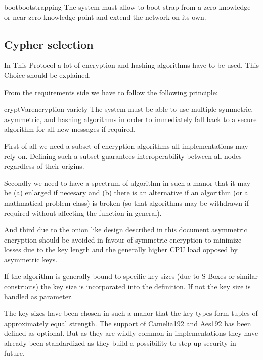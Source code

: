 \begin{requirement}{boot}{bootstrapping}
	The system must allow to boot strap from a zero knowledge or near zero knowledge point and extend the network on its own. 
\end{requirement}

\subsection{Cypher selection}
In This Protocol a lot of encryption and hashing algorithms have to be used. This Choice should be explained. 

From the requirements side we have to follow the following principle:
\begin{requirement}{cryptVar}{encryption variety}
	The system must be able to use multiple symmetric, asymmetric, and hashing algorithms in order to immediately fall back to a secure algorithm for all new messages if required. 
\end{requirement}

First of all we need a subset of encryption algorithms all implementations may rely on. Defining such a subset guarantees interoperability between all nodes regardless of their origins. 

Secondly we need to have a spectrum of algorithm in such a manor that it may be (a) enlarged if necesary and (b) there is an alternative if an algorithm (or a mathmatical problem class) is broken (so that algorithms may be withdrawn if required without affecting the function in general). 

And third due to the onion like design described in this document asymmetric encryption should be avoided in favour of symmetric encryption to minimize losses due to the key length and the generally higher CPU load opposed by asymmetric keys.

If the algorithm is generally bound to specific key sizes (due to S-Boxes or similar constructs) the key size is incorporated into the definition. If not the key size is handled as parameter.

The key sizes have been chosen in such a manor that the key types form tuples of approximately equal strength. The support of Camelia192 and Aes192 has been defined as optional. But as they are wildly common in implementations they have already been standardized as they  build a possibility to step up security in future.

